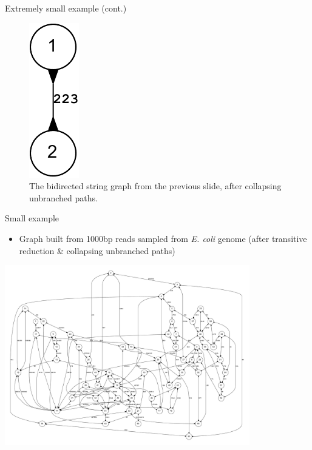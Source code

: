 \documentclass[xcolor=dvipsnames]{beamer}
\begin{document}
\begin{frame}{Extremely small example (cont.)}
    \begin{figure}[H]
        \includegraphics[scale=0.7]{example.reduced.mapped.collapsed.bidigraph-crop.pdf}
        \caption{The bidirected string graph from the previous slide, after
        collapsing unbranched paths.}
    \end{figure}
\end{frame}

\begin{frame}{Small example}
    \begin{itemize}
        \item Graph built from 1000bp reads sampled from {\it E. coli} genome
            (after transitive reduction \& collapsing unbranched paths)
    \end{itemize}
    \begin{center}
        \includegraphics[width=0.8\textwidth]{E_coli.pdf}
    \end{center}
\end{frame}
\end{document}
